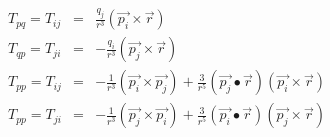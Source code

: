 \documentclass[12pt]{article}
\begin{document}
\begin{eqnarray*}
T_{pq} = T_{ij} & = & \frac{q_j}{r^3} (\vec{p_i} \times \vec{r}) \\
T_{qp} = T_{ji} & = & - \frac{q_i}{r^3} (\vec{p_j} \times \vec{r}) \\
T_{pp} = T_{ij} & = & -\frac{1}{r^3} (\vec{p_i} \times \vec{p_j}) + 
                      \frac{3}{r^5} (\vec{p_j} \bullet \vec{r})
		      (\vec{p_i} \times \vec{r}) \\
T_{pp} = T_{ji} & = & -\frac{1}{r^3} (\vec{p_j} \times \vec{p_i}) + 
                      \frac{3}{r^5} (\vec{p_i} \bullet \vec{r}) 
		      (\vec{p_j} \times \vec{r}) \\
\end{eqnarray*}                                                  
\end{document}
